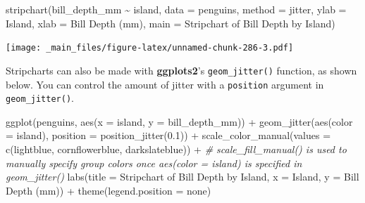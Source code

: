 \documentclass[
]{book}
\newenvironment{Shaded}{\begin{snugshade}}{\end{snugshade}}
\newcommand{\AttributeTok}[1]{\textcolor[rgb]{0.77,0.63,0.00}{#1}}
\newcommand{\CommentTok}[1]{\textcolor[rgb]{0.56,0.35,0.01}{\textit{#1}}}
\newcommand{\FloatTok}[1]{\textcolor[rgb]{0.00,0.00,0.81}{#1}}
\newcommand{\FunctionTok}[1]{\textcolor[rgb]{0.00,0.00,0.00}{#1}}
\newcommand{\NormalTok}[1]{#1}
\newcommand{\SpecialCharTok}[1]{\textcolor[rgb]{0.00,0.00,0.00}{#1}}
\newcommand{\StringTok}[1]{\textcolor[rgb]{0.31,0.60,0.02}{#1}}
\begin{document}
\begin{Shaded}
\begin{Highlighting}[]
\FunctionTok{stripchart}\NormalTok{(bill\_depth\_mm }\SpecialCharTok{\textasciitilde{}}\NormalTok{ island, }\AttributeTok{data =}\NormalTok{ penguins, }
           \AttributeTok{method =} \StringTok{\textquotesingle{}jitter\textquotesingle{}}\NormalTok{,}
           \AttributeTok{ylab =} \StringTok{\textquotesingle{}Island\textquotesingle{}}\NormalTok{, }\AttributeTok{xlab =} \StringTok{\textquotesingle{}Bill Depth (mm)\textquotesingle{}}\NormalTok{, }
           \AttributeTok{main =} \StringTok{\textquotesingle{}Stripchart of Bill Depth by Island\textquotesingle{}}\NormalTok{)}
\end{Highlighting}
\end{Shaded}

\texttt{[image: \_main\_files/figure-latex/unnamed-chunk-286-3.pdf]}

Stripcharts can also be made with \textbf{ggplots2}'s \texttt{geom\_jitter()} function, as shown below. You can control the amount of jitter with a \texttt{position} argument in \texttt{geom\_jitter()}.

\begin{Shaded}
\begin{Highlighting}[]
\FunctionTok{ggplot}\NormalTok{(penguins, }\FunctionTok{aes}\NormalTok{(}\AttributeTok{x =}\NormalTok{ island, }\AttributeTok{y =}\NormalTok{ bill\_depth\_mm)) }\SpecialCharTok{+}
  \FunctionTok{geom\_jitter}\NormalTok{(}\FunctionTok{aes}\NormalTok{(}\AttributeTok{color =}\NormalTok{ island), }\AttributeTok{position =} \FunctionTok{position\_jitter}\NormalTok{(}\FloatTok{0.1}\NormalTok{)) }\SpecialCharTok{+}
  \FunctionTok{scale\_color\_manual}\NormalTok{(}\AttributeTok{values =} \FunctionTok{c}\NormalTok{(}\StringTok{\textquotesingle{}lightblue\textquotesingle{}}\NormalTok{, }\StringTok{\textquotesingle{}cornflowerblue\textquotesingle{}}\NormalTok{, }\StringTok{\textquotesingle{}darkslateblue\textquotesingle{}}\NormalTok{)) }\SpecialCharTok{+} \CommentTok{\# scale\_fill\_manual() is used to manually specify group colors once aes(color = island) is specified in \textasciigrave{}geom\_jitter()\textasciigrave{}}
  \FunctionTok{labs}\NormalTok{(}\AttributeTok{title =} \StringTok{\textquotesingle{}Stripchart of Bill Depth by Island\textquotesingle{}}\NormalTok{, }
       \AttributeTok{x =} \StringTok{\textquotesingle{}Island\textquotesingle{}}\NormalTok{, }\AttributeTok{y =} \StringTok{\textquotesingle{}Bill Depth (mm)\textquotesingle{}}\NormalTok{) }\SpecialCharTok{+}
  \FunctionTok{theme}\NormalTok{(}\AttributeTok{legend.position =} \StringTok{\textquotesingle{}none\textquotesingle{}}\NormalTok{)}
\end{Highlighting}
\end{Shaded}
\end{document}
